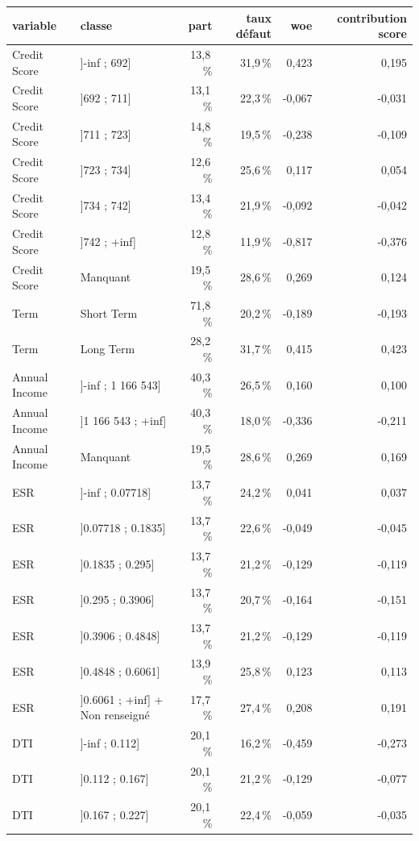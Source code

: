 \begin{tabular}{llrrrr}
\toprule
\textbf{variable} & \textbf{classe} & \textbf{part} & \textbf{taux défaut} & \textbf{woe} & \textbf{contribution score} \\
\midrule
Credit Score & ]-inf ; 692] & 13,8\,\% & 31,9\,\% & 0,423 & 0,195 \\
Credit Score & ]692 ; 711] & 13,1\,\% & 22,3\,\% & -0,067 & -0,031 \\
Credit Score & ]711 ; 723] & 14,8\,\% & 19,5\,\% & -0,238 & -0,109 \\
Credit Score & ]723 ; 734] & 12,6\,\% & 25,6\,\% & 0,117 & 0,054 \\
Credit Score & ]734 ; 742] & 13,4\,\% & 21,9\,\% & -0,092 & -0,042 \\
Credit Score & ]742 ; +inf] & 12,8\,\% & 11,9\,\% & -0,817 & -0,376 \\
Credit Score & Manquant & 19,5\,\% & 28,6\,\% & 0,269 & 0,124 \\
Term & Short Term & 71,8\,\% & 20,2\,\% & -0,189 & -0,193 \\
Term & Long Term & 28,2\,\% & 31,7\,\% & 0,415 & 0,423 \\
Annual Income & ]-inf ; 1 166 543] & 40,3\,\% & 26,5\,\% & 0,160 & 0,100 \\
Annual Income & ]1 166 543 ; +inf] & 40,3\,\% & 18,0\,\% & -0,336 & -0,211 \\
Annual Income & Manquant & 19,5\,\% & 28,6\,\% & 0,269 & 0,169 \\
ESR & ]-inf ; 0.07718] & 13,7\,\% & 24,2\,\% & 0,041 & 0,037 \\
ESR & ]0.07718 ; 0.1835] & 13,7\,\% & 22,6\,\% & -0,049 & -0,045 \\
ESR & ]0.1835 ; 0.295] & 13,7\,\% & 21,2\,\% & -0,129 & -0,119 \\
ESR & ]0.295 ; 0.3906] & 13,7\,\% & 20,7\,\% & -0,164 & -0,151 \\
ESR & ]0.3906 ; 0.4848] & 13,7\,\% & 21,2\,\% & -0,129 & -0,119 \\
ESR & ]0.4848 ; 0.6061] & 13,9\,\% & 25,8\,\% & 0,123 & 0,113 \\
ESR & ]0.6061 ; +inf] + Non renseigné & 17,7\,\% & 27,4\,\% & 0,208 & 0,191 \\
DTI & ]-inf ; 0.112] & 20,1\,\% & 16,2\,\% & -0,459 & -0,273 \\
DTI & ]0.112 ; 0.167] & 20,1\,\% & 21,2\,\% & -0,129 & -0,077 \\
DTI & ]0.167 ; 0.227] & 20,1\,\% & 22,4\,\% & -0,059 & -0,035 \\

\end{tabular}
